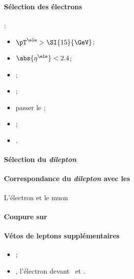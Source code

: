\paragraph{Sélection des électrons}
:
\begin{itemize}
    \item $\pT^{\ele} > \SI{15}{\GeV}$;
    \item $\abs{\eta^{\ele}} < 2.4$;
    \item \Leptondzdxy;
    \item {};
    \item passer le \NinetyNineEleMVAnoIso;
    \item \LessTwoMissingHitsVertex;
    \item \PassConversionVeto.
\end{itemize}
\paragraph{Sélection du \emph{dilepton}}
\AtLeastOneOSPair{\mu\ele}
\IfMoreOnePair
\paragraph{Correspondance du \emph{dilepton} avec les \HLTpaths}
L'électron et le muon \FromPairMatchToHLTObjects{}

\paragraph{Coupure sur \Dzeta}
\DzetaEleMU
\paragraph{Vétos de leptons supplémentaires}
\LeptonVetoes
\begin{itemize}
    \item \LeptonVetoesSecondMuon;
    \item \LeptonVetoesSecondEle, l'électron devant \PassConversionVeto\ et \LessTwoMissingHitsVertex.
\end{itemize}

